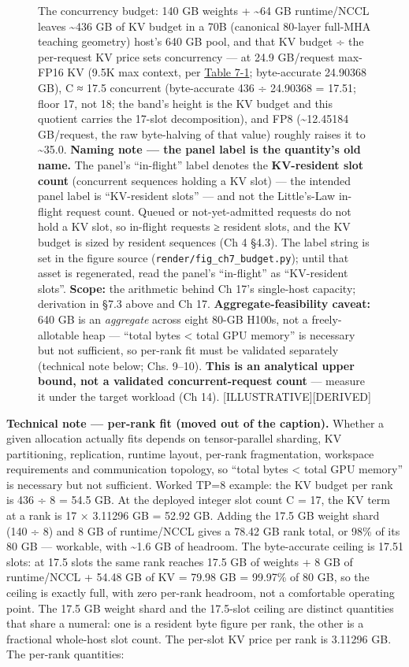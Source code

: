 \begin{figure}
\caption[The concurrency budget]{The concurrency budget: 140 GB weights + \textasciitilde64 GB runtime/NCCL leaves \textasciitilde436 GB of KV budget in a 70B (canonical 80-layer full-MHA teaching geometry) host's 640 GB pool, and that KV budget ÷ the per-request KV price sets concurrency --- at 24.9 GB/request max-FP16 KV (9.5K max context, per \hyperref[tab:7.1]{Table 7-1}; byte-accurate 24.90368 GB), C ≈ 17.5 concurrent (byte-accurate 436 ÷ 24.90368 = 17.51; floor 17, not 18; the band's height is the KV budget and this quotient carries the 17-slot decomposition), and FP8 (\textasciitilde12.45184 GB/request, the raw byte-halving of that value) roughly raises it to \textasciitilde35.0. \textbf{Naming note --- the panel label is the quantity's old name.} The panel's ``in-flight'' label denotes the \textbf{KV-resident slot count} (concurrent sequences holding a KV slot) --- the intended panel label is ``KV-resident slots'' --- and not the Little's-Law in-flight request count. Queued or not-yet-admitted requests do not hold a KV slot, so in-flight requests ≥ resident slots, and the KV budget is sized by resident sequences (Ch 4 §4.3). The label string is set in the figure source (\texttt{render/fig\_ch7\_budget.py}); until that asset is regenerated, read the panel's ``in-flight'' as ``KV-resident slots''. \textbf{Scope:} the arithmetic behind Ch 17's single-host capacity; derivation in §7.3 above and Ch 17. \textbf{Aggregate-feasibility caveat:} 640 GB is an \emph{aggregate} across eight 80-GB H100s, not a freely-allotable heap --- ``total bytes \textless{} total GPU memory'' is necessary but not sufficient, so per-rank fit must be validated separately (technical note below; Chs. 9--10). \textbf{This is an analytical upper bound, not a validated concurrent-request count} --- measure it under the target workload (Ch 14). \mbox{{[}ILLUSTRATIVE{]}}\hspace{0pt}\mbox{{[}DERIVED{]}}}

\label{fig:7.7}\end{figure}

\textbf{Technical note --- per-rank fit (moved out of the caption).}
Whether a given allocation actually fits depends on tensor-parallel
sharding, KV partitioning, replication, runtime layout, per-rank
fragmentation, workspace requirements and communication topology, so
``total bytes \textless{} total GPU memory'' is necessary but not
sufficient. Worked TP=8 example: the KV budget per rank is 436 ÷ 8 =
54.5 GB. At the deployed integer slot count C = 17, the KV term at a
rank is 17 × 3.11296 GB = 52.92 GB. Adding the 17.5 GB weight shard (140
÷ 8) and 8 GB of runtime/NCCL gives a 78.42 GB rank total, or 98\% of
its 80 GB --- workable, with \textasciitilde1.6 GB of headroom. The
byte-accurate ceiling is 17.51 slots: at 17.5 slots the same rank
reaches 17.5 GB of weights + 8 GB of runtime/NCCL + 54.48 GB of KV =
79.98 GB = 99.97\% of 80 GB, so the ceiling is exactly full, with zero
per-rank headroom, not a comfortable operating point. The 17.5 GB weight
shard and the 17.5-slot ceiling are distinct quantities that share a
numeral: one is a resident byte figure per rank, the other is a
fractional whole-host slot count. The per-slot KV price per rank is
3.11296 GB. The per-rank quantities:

